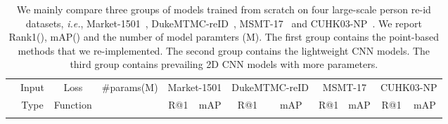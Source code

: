 \documentclass[journal]{IEEEtran}
\def\ie{\emph{i.e.}}
\begin{document}
\setlength{\tabcolsep}{7pt}
\begin{table*}
\scriptsize
\caption{We mainly compare three groups of models trained from scratch on four large-scale person re-id datasets, \ie, Market-1501~\cite{zheng2015scalable}, DukeMTMC-reID~\cite{ristani2016performance,zheng2017unlabeled}, MSMT-17~\cite{wei2018person} and CUHK03-NP~\cite{li2014deepreid,zhong2017re}. We report Rank1(), mAP() and the number of model paramters (M). The first group contains  the point-based methods that we re-implemented. The second group contains the lightweight CNN models. The third group contains prevailing 2D CNN models with more parameters. }
\begin{center}
\label{table:supervised}
\begin{tabular}{l|c|c|c|cc|cc|cc|cc}
\shline
\multirow{2}{*}{Method} & Input  & Loss &\multirow{2}{*}{\#params(M)} & \multicolumn{2}{c|}{Market-1501} & \multicolumn{2}{c|}{DukeMTMC-reID} & \multicolumn{2}{c|}{MSMT-17} & \multicolumn{2}{c}{CUHK03-NP}\\
& Type & Function & & R@1 & mAP & R@1 & mAP & R@1 & mAP & R@1 & mAP \\
\shline



\end{tabular}
\end{center}
\end{table*}
\end{document}
